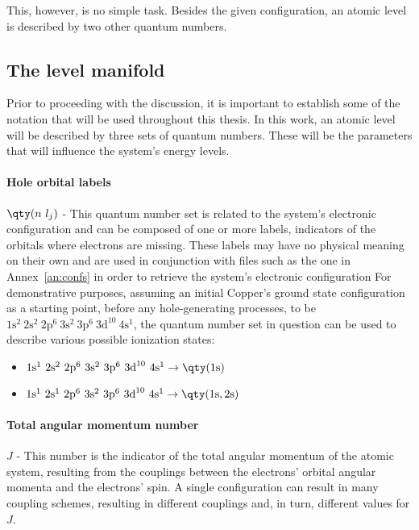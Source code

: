 This, however, is no simple task. Besides the given configuration, an atomic level is described by two other quantum numbers.

\subsection{The level manifold}




Prior to proceeding with the discussion, it is important to establish some of the notation that will be used throughout this thesis. In this work, an atomic level will be described by three sets of quantum numbers. These will be the parameters that will influence the system's energy levels.

\paragraph{Hole orbital labels}


$\qty(n\ l_j)$ - This quantum number set is related to the system's electronic configuration and can be composed of one or more labels, indicators of the orbitals where electrons are missing. These labels may have no physical meaning on their own and are used in conjunction with files such as the one in Annex~\ref{an:confs} in order to retrieve the system's electronic configuration
For demonstrative purposes, assuming an initial Copper's ground state configuration as a starting point, before any hole-generating processes, to be $1\text{s}^2\ 2\text{s}^2\ 2\text{p}^6\ 3\text{s}^2\ 3\text{p}^6\ 3\text{d}^{10}\ 4\text{s}^1$, the quantum number set in question can be used to describe various possible ionization states:

\begin{itemize}
    \item $1\text{s}^1\ 2\text{s}^2\ 2\text{p}^6\ 3\text{s}^2\ 3\text{p}^6\ 3\text{d}^{10}\ 4\text{s}^1  \rightarrow \qty(1\text{s})$
    \item $1\text{s}^1\ 2\text{s}^1\ 2\text{p}^6\ 3\text{s}^2\ 3\text{p}^6\ 3\text{d}^{10}\ 4\text{s}^1 \rightarrow \qty(1\text{s},2\text{s})$
\end{itemize}




\paragraph{Total angular momentum number}


$J$ - This number is the indicator of the total angular momentum of the atomic system, resulting from the couplings between the electrons'  orbital angular momenta and the electrons' spin. A single configuration can result in many coupling schemes, resulting in different couplings and, in turn, different values for $J$.

